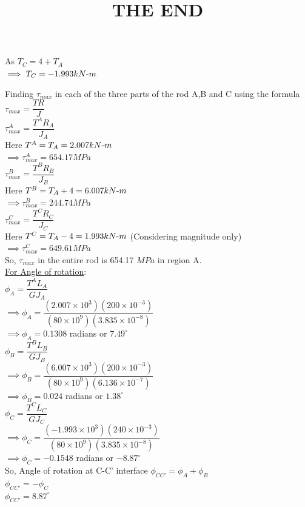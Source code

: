 \documentclass{article}
\begin{document}
\noindent As $T_C= 4+T_A$\\
$\implies T_C= -1.993 kN{\text -}m$

\noindent Finding $\tau_{max}$ in each of the three parts of the rod A,B and C using the formula 
$\tau_{max}=\dfrac{TR}{J}$\\

\noindent $\tau_{max}^A=\dfrac{T^AR_A}{J_A}$\\
Here $T^A=T_A= 2.007 kN{\text -}m$\\
$\implies \tau_{max}^A=654.17 MPa$\\

\noindent $\tau_{max}^B=\dfrac{T^BR_B}{J_B}$\\
Here $T^B=T_A+4= 6.007 kN{\text -}m$\\
$\implies \tau_{max}^B=244.74 MPa$\\

\noindent $\tau_{max}^C=\dfrac{T^CR_C}{J_C}$\\
Here $T^C=T_A-4= 1.993 kN{\text -}m$ (Considering magnitude only) \\
$\implies \tau_{max}^C=649.61 MPa$\\

\noindent So, $\tau_{max}$ in the entire rod is 654.17 $MPa$ in region A. \\

\noindent \underline{For Angle of rotation}:\\

\noindent $\phi_A=\dfrac{T^AL_A}{GJ_A}$\\
$\implies \phi_A= \dfrac{(2.007 \times 10^3)(200 \times 10^{-3})}{(80 \times 10^9)(3.835 \times 10^{-8})}$\\
$\implies \phi_A=0.1308$ radians or $7.49^\circ$\\

\noindent $\phi_B=\dfrac{T^BL_B}{GJ_B}$\\
$\implies \phi_B= \dfrac{(6.007 \times 10^3)(200 \times 10^{-3})}{(80 \times 10^9)(6.136 \times 10^{-7})}$\\
$\implies \phi_B=0.024$ radians or $1.38^\circ$\\

$\phi_C=\dfrac{T^CL_C}{GJ_C}$\\
$\implies \phi_C= \dfrac{(-1.993 \times 10^3)(240 \times 10^{-3})}{(80 \times 10^9)(3.835 \times 10^{-8})}$\\
$\implies \phi_C=-0.1548$ radians or $-8.87^\circ$\\

\noindent So, Angle of rotation at C-C' interface $\phi_{CC'}=\phi_A+\phi_B$ \\
$\phi_{CC'}=-\phi_C$\\
$\phi_{CC'}= 8.87^\circ$ \\
\bigbreak

\begin{center}
\title{\LARGE \textbf{THE END}}
\end{center}
\end{document}
